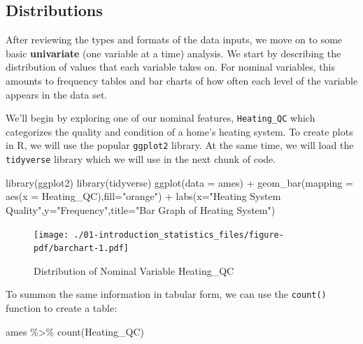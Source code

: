 \documentclass[
  letterpaper,
  DIV=11,
  numbers=noendperiod]{scrreprt}
\newenvironment{Shaded}{\begin{snugshade}}{\end{snugshade}}
\newcommand{\AttributeTok}[1]{\textcolor[rgb]{0.40,0.45,0.13}{#1}}
\newcommand{\FunctionTok}[1]{\textcolor[rgb]{0.28,0.35,0.67}{#1}}
\newcommand{\NormalTok}[1]{\textcolor[rgb]{0.00,0.23,0.31}{#1}}
\newcommand{\SpecialCharTok}[1]{\textcolor[rgb]{0.37,0.37,0.37}{#1}}
\newcommand{\StringTok}[1]{\textcolor[rgb]{0.13,0.47,0.30}{#1}}
\begin{document}
\hypertarget{sec-dist}{%
\subsection{Distributions}\label{sec-dist}}

After reviewing the types and formats of the data inputs, we move on to
some basic \textbf{univariate} (one variable at a time) analysis. We
start by describing the distribution of values that each variable takes
on. For nominal variables, this amounts to frequency tables and bar
charts of how often each level of the variable appears in the data set.

We'll begin by exploring one of our nominal features,
\texttt{Heating\_QC} which categorizes the quality and condition of a
home's heating system. To create plots in R, we will use the popular
\texttt{ggplot2} library. At the same time, we will load the
\texttt{tidyverse} library which we will use in the next chunk of code.

\begin{Shaded}
\begin{Highlighting}[]
\FunctionTok{library}\NormalTok{(ggplot2)}
\FunctionTok{library}\NormalTok{(tidyverse)}
\FunctionTok{ggplot}\NormalTok{(}\AttributeTok{data =}\NormalTok{ ames) }\SpecialCharTok{+}
  \FunctionTok{geom\_bar}\NormalTok{(}\AttributeTok{mapping =} \FunctionTok{aes}\NormalTok{(}\AttributeTok{x =}\NormalTok{ Heating\_QC),}\AttributeTok{fill=}\StringTok{"orange"}\NormalTok{) }\SpecialCharTok{+} \FunctionTok{labs}\NormalTok{(}\AttributeTok{x=}\StringTok{"Heating System Quality"}\NormalTok{,}\AttributeTok{y=}\StringTok{"Frequency"}\NormalTok{,}\AttributeTok{title=}\StringTok{"Bar Graph of Heating System"}\NormalTok{)}
\end{Highlighting}
\end{Shaded}

\begin{figure}[H]

{\centering \texttt{[image: ./01-introduction\_statistics\_files/figure-pdf/barchart-1.pdf]}

}

\caption{Distribution of Nominal Variable Heating\_QC}

\end{figure}

To summon the same information in tabular form, we can use the
\texttt{count()} function to create a table:

\begin{Shaded}
\begin{Highlighting}[]
\NormalTok{ames }\SpecialCharTok{\%\textgreater{}\%} 
  \FunctionTok{count}\NormalTok{(Heating\_QC)}
\end{Highlighting}
\end{Shaded}
\end{document}
